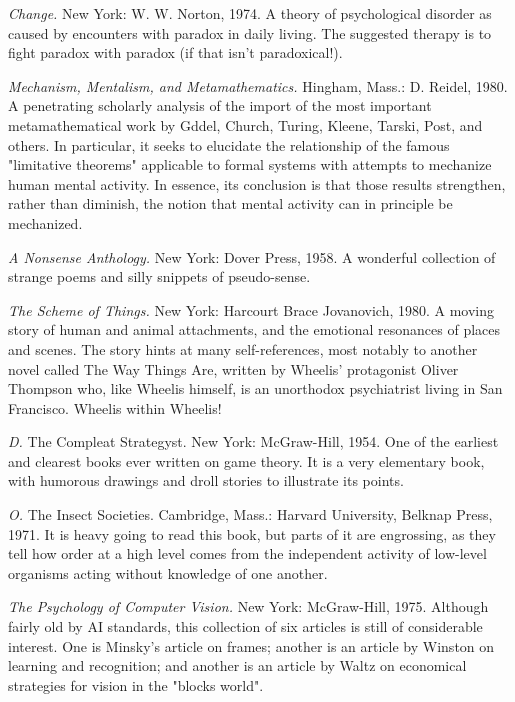  {\sl Change.} New York: W. W. Norton, 1974. A theory of psychological disorder as caused by encounters with paradox in daily living. The suggested therapy is to fight paradox with paradox (if that isn't paradoxical!).

 {\sl Mechanism, Mentalism, and Metamathematics.} Hingham, Mass.: D. Reidel, 1980. A penetrating scholarly analysis of the import of the most important metamathematical work by Gddel, Church, Turing, Kleene, Tarski, Post, and others. In particular, it seeks to elucidate the relationship of the famous "limitative theorems" applicable to formal systems with attempts to mechanize human mental activity. In essence, its conclusion is that those results strengthen, rather than diminish, the notion that mental activity can in principle be mechanized.

 {\sl A Nonsense Anthology.} New York: Dover Press, 1958. A wonderful collection of strange poems and silly snippets of pseudo-sense.

 {\sl The Scheme of Things.} New York: Harcourt Brace Jovanovich, 1980. A moving story of human and animal attachments, and the emotional resonances of places and scenes. The story hints at many self-references, most notably to another novel called The Way Things Are, written by Wheelis' protagonist Oliver Thompson who, like Wheelis himself, is an unorthodox psychiatrist living in San Francisco. Wheelis within Wheelis!

 {\sl D.} The Compleat Strategyst. New York: McGraw-Hill, 1954. One of the earliest and clearest books ever written on game theory. It is a very elementary book, with humorous drawings and droll stories to illustrate its points.

 {\sl O.} The Insect Societies. Cambridge, Mass.: Harvard University, Belknap Press, 1971. It is heavy going to read this book, but parts of it are engrossing, as they tell how order at a high level comes from the independent activity of low-level organisms acting without knowledge of one another.

 {\sl The Psychology of Computer Vision.} New York: McGraw-Hill, 1975. Although fairly old by AI standards, this collection of six articles is still of considerable interest. One is Minsky's article on frames; another is an article by Winston on learning and recognition; and another is an article by Waltz on economical strategies for vision in the "blocks world".

